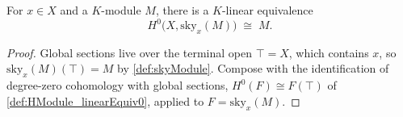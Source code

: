 \begin{definition}
  \label{def:skyModuleGammaEquiv}
  \leanok
  For \(x \in X\) and a \(K\)-module \(M\), there is a \(K\)-linear equivalence
  \[
    H^0\bigl(X, \mathrm{sky}_x(M)\bigr) \;\cong\; M .
  \]
\end{definition}
\begin{proof}
  \leanok
  Global sections live over the terminal open \(\top = X\), which contains \(x\), so
  \(\mathrm{sky}_x(M)(\top) = M\) by \ref{def:skyModule}. Compose with the identification of
  degree-zero cohomology with global sections, \(H^0(F) \cong F(\top)\) of
  \ref{def:HModule_linearEquiv0}, applied to \(F = \mathrm{sky}_x(M)\).
\end{proof}


